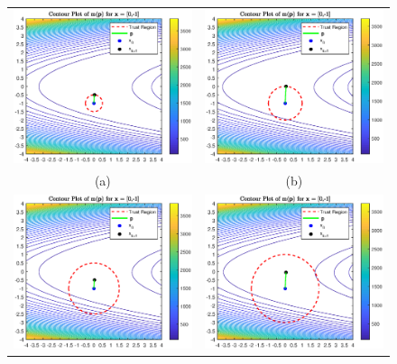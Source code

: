 \documentclass[a4paper,11pt]{article}
\begin{document}
\begin{figure}[!ht]
	\centering
	\begin{tabular}{cc}
		\includegraphics[width=.55\textwidth]{Trust_x0_Dk0p5} &\hspace{-25pt} \includegraphics[width=.55\textwidth]{Trust_x0_Dk1} \\
		(a) & (b)\\
		\includegraphics[width=.55\textwidth]{Trust_x0_Dk1p5} &\hspace{-25pt} \includegraphics[width=.55\textwidth]{Trust_x0_Dk2} \\

\end{tabular}
\end{figure}
\end{document}
